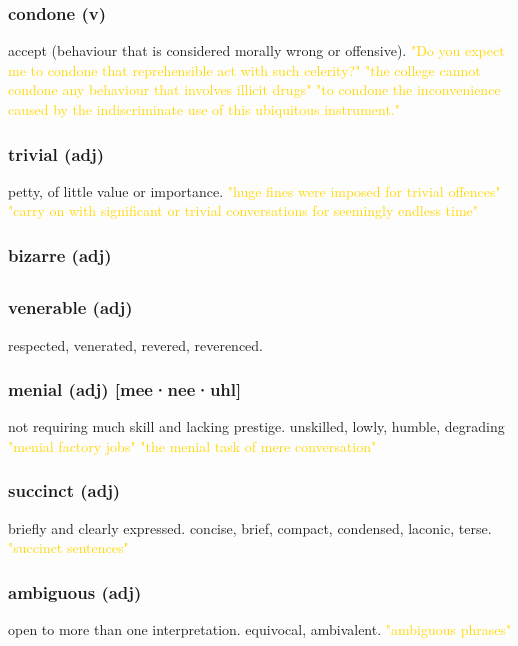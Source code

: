 \documentclass{proc}
\begin{document}
	\subsubsection{\textcolor{brickred}{condone} (v)}
	accept (behaviour that is considered morally wrong or offensive).
	\textcolor{gold}{"Do you expect me to condone that reprehensible act with such celerity?" "the college cannot condone any behaviour that involves illicit drugs" "to condone the inconvenience caused by  the indiscriminate use of  this ubiquitous instrument."}
	
	\subsubsection{\textcolor{brickred}{trivial} (adj)}
	petty, of little value or importance.
	\textcolor{gold}{"huge fines were imposed for trivial offences" "carry on with significant or trivial conversations for seemingly endless time"}
	
	\subsubsection{\textcolor{brickred}{bizarre} (adj)}
	
	\newpage
	\subsection{}
	\subsubsection{\textcolor{brickred}{venerable} (adj)}
	respected,
	venerated,
	revered,
	reverenced.
	
	\subsubsection{\textcolor{brickred}{menial} (adj) [mee·nee·uhl]}
	not requiring much skill and lacking prestige. unskilled,
	lowly,
	humble,
	degrading
	\textcolor{gold}{"menial factory jobs" "the menial task of  mere conversation"}
	
	\subsubsection{\textcolor{brickred}{succinct} (adj)}
	briefly and clearly expressed. concise,
	brief,
	compact,
	condensed,
	laconic,
	terse.
	\textcolor{gold}{"succinct sentences"}
	
	\subsubsection{\textcolor{brickred}{ambiguous} (adj)}
	open to more than one interpretation. equivocal,
	ambivalent.
	\textcolor{gold}{"ambiguous phrases"}
	
\end{document}
